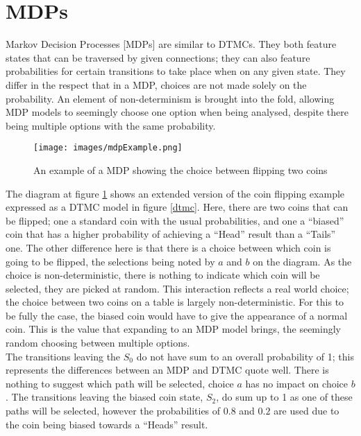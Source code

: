 \documentclass{l4proj}
\begin{document}
\section{MDPs}


Markov Decision Processes [MDPs] are similar to DTMCs. They both feature states that can be traversed by given connections; they can also feature probabilities for certain transitions to take place when on any given state. They differ in the respect that in a MDP, choices are not made solely on the probability. An element of non-determinism is brought into the fold, allowing MDP models to seemingly choose one option when being analysed, despite there being multiple options with the same probability. 

\begin{figure}[ht!]
\centering
\texttt{[image: images/mdpExample.png]}
\caption{An example of a MDP showing the choice between flipping two coins}
\label{mdp}
\end{figure}

The diagram at figure \ref{mdp} shows an extended version of the coin flipping example expressed as a DTMC model in figure \ref{dtmc}. Here, there are two coins that can be flipped; one a standard coin with the usual probabilities, and one a ``biased'' coin that has a higher probability of achieving a ``Head'' result than a ``Tails'' one. The other difference here is that there is a choice between which coin is going to be flipped, the selections being noted by $a$ and $b$ on the diagram. As the choice is non-deterministic, there is nothing to indicate which coin will be selected, they are picked at random. This interaction reflects a real world choice; the choice between two coins on a table is largely non-deterministic. For this to be fully the case, the biased coin would have to give the appearance of a normal coin. This is the value that expanding to an MDP model brings, the seemingly random choosing between multiple options.\\ 
The transitions leaving the $S_0$ do not have sum to an overall probability of 1; this represents the differences between an MDP and DTMC quote well. There is nothing to suggest which path will be selected, choice $a$ has no impact on choice $b$. The transitions leaving the biased coin state, $S_2$, do sum up to 1 as one of these paths will be selected, however the probabilities of $0.8$ and $0.2$ are used due to the coin being biased towards a ``Heads'' result.


\end{document}
